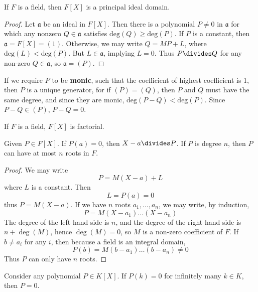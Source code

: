 \begin{corollary}
    If $F$ is a field, then $F[X]$ is a principal ideal domain.
\end{corollary}
\begin{proof}
    Let $\mathfrak{a}$ be an ideal in $F[X]$. Then there is a polynomial $P \neq 0$ in $\mathfrak{a}$ for which any nonzero $Q \in \mathfrak{a}$ satisfies $\text{deg}(Q) \geq \text{deg}(P)$. If $P$ is a constant, then $\mathfrak{a} = F[X] = (1)$. Otherwise, we may write $Q = MP + L$, where $\text{deg}(L) < \text{deg}(P)$. But $L \in \mathfrak{a}$, implying $L = 0$. Thus $P \divides Q$ for any non-zero $Q \in \mathfrak{a}$, so $\mathfrak{a} = (P)$.
\end{proof}

If we require $P$ to be {\bf monic}, such that the coefficient of highest coefficient is 1, then $P$ is a unique generator, for if $(P) = (Q)$, then $P$ and $Q$ must have the same degree, and since they are monic, $\text{deg}(P - Q) < \text{deg}(P)$. Since $P - Q \in (P)$, $P - Q = 0$.

\begin{corollary}
    If $F$ is a field, $F[X]$ is factorial.
\end{corollary}

\begin{theorem}
    Given $P \in F[X]$. If $P(a) = 0$, then $X - a \divides P$. If $P$ is degree $n$, then $P$ can have at most $n$ roots in $F$.
\end{theorem}
\begin{proof}
    We may write
    \[ P = M(X - a) + L \]
    where $L$ is a constant. Then
    \[ L = P(a) = 0 \]
    thus $P = M(X - a)$. If we have $n$ roots $a_1, \dots, a_n$, we may write, by induction,
    \[ P = M (X - a_1) \dots (X - a_n) \]
    The degree of the left hand side is $n$, and the degree of the right hand side is $n + \deg(M)$, hence $\deg(M) = 0$, so $M$ is a non-zero coefficient of $F$. If $b \neq a_i$ for any $i$, then because a field is an integral domain,
    \[ P(b) = M(b - a_1) \dots (b - a_n) \neq 0 \]
    Thus $P$ can only have $n$ roots.
\end{proof}

\begin{corollary}
    Consider any polynomial $P \in K[X]$. If $P(k) = 0$ for infinitely many $k \in K$, then $P = 0$.
\end{corollary}

